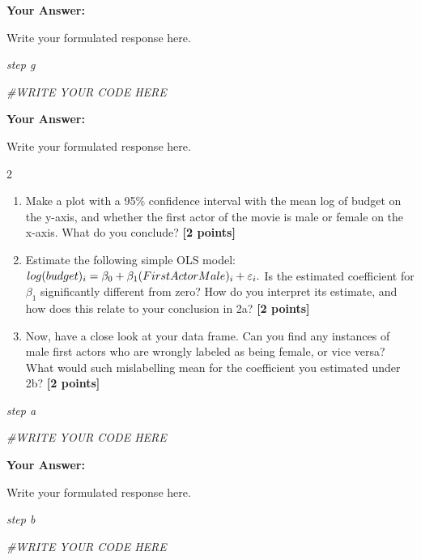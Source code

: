 \documentclass[
]{article}
\newenvironment{Shaded}{\begin{snugshade}}{\end{snugshade}}
\newcommand{\CommentTok}[1]{\textcolor[rgb]{0.56,0.35,0.01}{\textit{#1}}}
\providecommand{\tightlist}{%
  \setlength{\itemsep}{0pt}\setlength{\parskip}{0pt}}
\begin{document}
\textbf{Your Answer:}

Write your formulated response here.

\emph{step g}

\begin{Shaded}
\begin{Highlighting}[]
\CommentTok{\#WRITE YOUR CODE HERE}
\end{Highlighting}
\end{Shaded}

\textbf{Your Answer:}

Write your formulated response here.

2

\begin{enumerate}
\def\labelenumi{\alph{enumi}.}
\tightlist
\item
  Make a plot with a 95\% confidence interval with the mean log of
  budget on the y-axis, and whether the first actor of the movie is male
  or female on the x-axis. What do you conclude? \textbf{[2 points]}
\item
  Estimate the following simple OLS model:
  \(log(budget)_i=\beta_0+\beta_1 \text(FirstActorMale)_i + \varepsilon_i.\)
  Is the estimated coefficient for \(\beta_1\) significantly different
  from zero? How do you interpret its estimate, and how does this relate
  to your conclusion in 2a? \textbf{[2 points]}
\item
  Now, have a close look at your data frame. Can you find any instances
  of male first actors who are wrongly labeled as being female, or vice
  versa? What would such mislabelling mean for the coefficient you
  estimated under 2b? \textbf{[2 points]}
\end{enumerate}

\emph{step a}

\begin{Shaded}
\begin{Highlighting}[]
\CommentTok{\#WRITE YOUR CODE HERE}
\end{Highlighting}
\end{Shaded}

\textbf{Your Answer:}

Write your formulated response here.

\emph{step b}

\begin{Shaded}
\begin{Highlighting}[]
\CommentTok{\#WRITE YOUR CODE HERE}
\end{Highlighting}
\end{Shaded}
\end{document}
